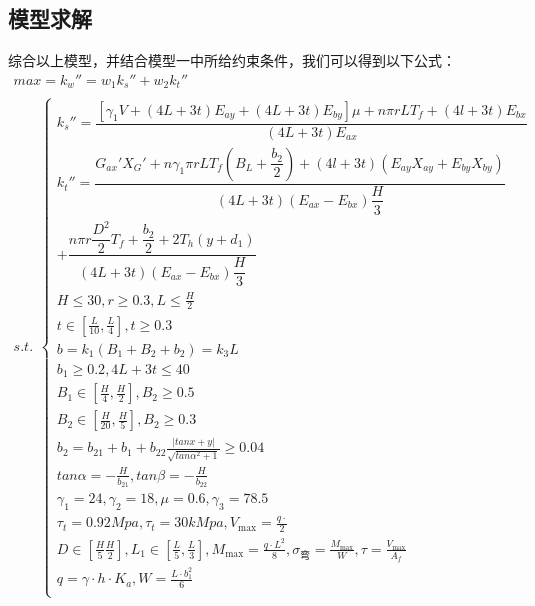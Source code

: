 \documentclass[withoutpreface,bwprint]{cumcmthesis}
\begin{document}
\subsection{模型求解}
综合以上模型，并结合模型一中所给约束条件，我们可以得到以下公式：
\begin{equation}
    \begin{array}{c} 
         max=k_w''=w_1k_s''+w_2k_t''\\[0.2cm]
            s.t.    
            \begin{aligned}
                \begin{cases}
                    k_s'' = \dfrac{[\gamma_1 V + (4L + 3t)E_{ay} + (4L + 3t)E_{by}]\mu + n\pi r L T_f + (4l + 3t)E_{bx}}{(4L + 3t)E_{ax}} \\
                    k_t'' = \dfrac{G_{ax}' X_G' + n\gamma_1 \pi r L T_f \left(B_L + \dfrac{b_2}{2}\right) + (4l + 3t)\left(E_{ay}X_{ay} + E_{by}X_{by}\right)}{(4L + 3t)\left(E_{ax} - E_{bx}\right)\dfrac{H}{3}} \\
                    + \dfrac{n\pi r \dfrac{D^2}{2}T_f + \dfrac{b_2}{2} + 2T_h(y + d_1)}{(4L + 3t)\left(E_{ax} - E_{bx}\right)\dfrac{H}{3}}\\
                    H\leq30 ,r\ge 0.3,L\leq\frac{H}{2}\\
                    t\in[\frac{L}{10},\frac{L}{4}],t\geq0.3 \\
                    b=k_{1}(B_{1}+B_{2}+b_{2})=k_{3}L \\
                    b_{1}\geq0.2 ,4L+3t\leq40 \\
                    B_{1}\in[\frac{H}{4},\frac{H}{2}],B_{2}\geq0.5 \\
                    B_{2}\in[\frac{H}{20},\frac{H}{5}],B_{2}\geq0.3 \\
                    b_{2}=b_{21}+b_{1}+b_{22} \frac{|tanx+y|}{\sqrt{tan\alpha^2+1} } \ge 0.04\\
                    tan\alpha=-\frac{H}{b_{21}},tan\beta=-\frac{H}{b_{22} }\\
                    \gamma_1=24,\gamma _2=18,\mu =0.6,\gamma _3=78.5\\\tau_t=0.92Mpa,\tau_t=30kMpa, V_{\text{max}} = \frac{q \cdot }{2}\\
                    D\in [\frac{H}{5}\frac{H}{2}],L_1\in [\frac{L}{5} ,\frac{L}{3} ],
                    M_{\text{max}} = \frac{q \cdot L^2}{8},\sigma_{\text{弯}} = \frac{M_{\text{max}}}{W}, \tau = \frac{V_{\text{max}}}{A_f}\\
                    q = \gamma \cdot h \cdot K_a,W = \frac{L \cdot b_1^2}{6}\\

\end{cases}
\end{aligned}
\end{array}
\end{equation}
\end{document}
